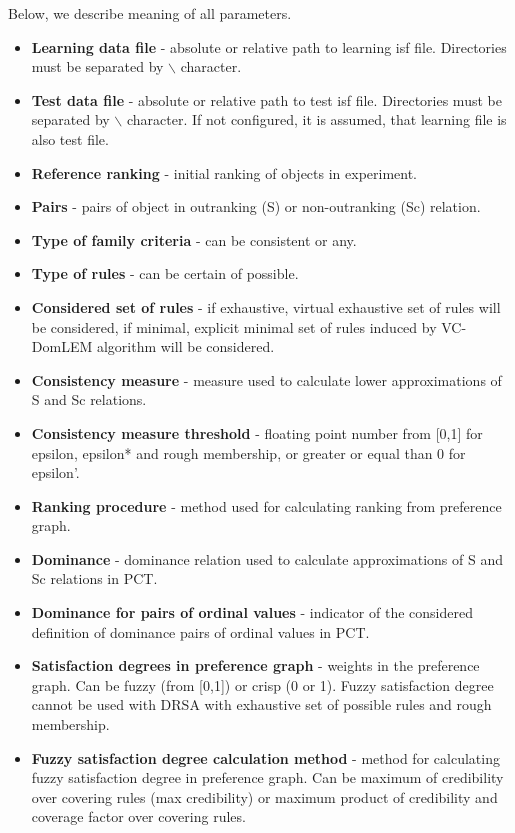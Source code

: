 Below, we describe meaning of all parameters.
\begin{itemize}
	\item \textbf{Learning data file} - absolute or relative path to learning isf file. Directories must be separated by $\backslash$ character.
	\item \textbf{Test data file} - absolute or relative path to test isf file. Directories must be separated by $\backslash$ character. If not configured, it is assumed, that learning file is also test file.
	\item \textbf{Reference ranking} - initial ranking of objects in experiment.
	\item \textbf{Pairs} - pairs of object in outranking (S) or non-outranking (Sc) relation.
	\item \textbf{Type of family criteria} - can be consistent or any.
	\item \textbf{Type of rules} - can be certain of possible.
	\item \textbf{Considered set of rules} - if exhaustive, virtual exhaustive set of rules will be considered, if minimal, explicit minimal set of rules induced by VC-DomLEM algorithm will be considered.
	\item \textbf{Consistency measure} - measure used to calculate lower approximations of S and Sc relations.
	\item \textbf{Consistency measure threshold} - floating point number from [0,1] for epsilon, epsilon* and rough membership, or greater or equal than 0 for epsilon'.
	\item \textbf{Ranking procedure} - method used for calculating ranking from preference graph.
	\item \textbf{Dominance} - dominance relation used to calculate approximations of S and Sc relations in PCT.
	\item \textbf{Dominance for pairs of ordinal values} - indicator of the considered definition of dominance pairs of ordinal values in PCT.
	\item \textbf{Satisfaction degrees in preference graph} - weights in the preference graph. Can be fuzzy (from [0,1]) or crisp (0 or 1). Fuzzy satisfaction degree cannot be used with DRSA with exhaustive set of possible rules and rough membership.
	\item \textbf{Fuzzy satisfaction degree calculation method} - method for calculating fuzzy satisfaction degree in preference graph. Can be maximum of credibility over covering rules (max credibility) or maximum product of credibility and coverage factor over covering rules.

\end{itemize}
